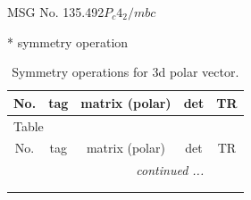 \documentclass[fleqn,8pt]{jsarticle}
\begin{document}
\setcounter{MaxMatrixCols}{32}

\renewcommand{\tablename}{Table~}
\renewcommand{\figurename}{Figure~}
\begin{center}
\LARGE
MSG No. 135.492\quad$P_{c}4_{2}/mbc$
\end{center}
* symmetry operation
\renewcommand{\arraystretch}{1.3}
\begin{longtable}{ccccc}
\caption{Symmetry operations for 3d polar vector.}
 \\
 \hline \hline
No. & tag & matrix (polar) & det & TR \\ \hline \endfirsthead

\multicolumn{4}{l}{\tablename\ \thetable{}} \\
 \hline \hline
No. & tag & matrix (polar) & det & TR \\ \hline \endhead

 \hline \hline
\multicolumn{4}{r}{\footnotesize\it continued ...} \\ \endfoot

 \hline \hline
\multicolumn{4}{r}{} \\ \endlastfoot


\end{longtable}
\end{document}
